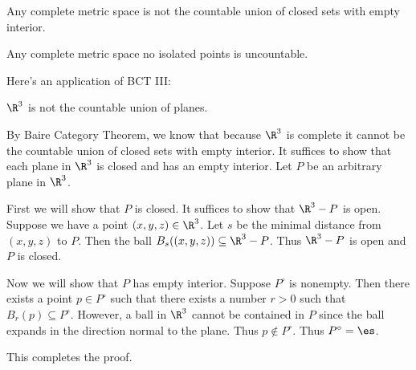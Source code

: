 \documentclass[class=article, crop=false]{standalone}
\begin{document}
\begin{thm}
    Any complete metric space is not the countable union of closed sets with empty interior.
\end{thm}

\begin{coro}
    Any complete metric space no isolated points is uncountable.
\end{coro}

Here's an application of BCT III:
\begin{ex}
    $\R^3$ is not the countable union of planes.
\end{ex}
\begin{pf}
    By Baire Category Theorem, we know that because $\R^3$ is complete it cannot be the countable union of closed sets with empty interior. It suffices to show that each plane in $\R^3$ is closed and has an empty interior. Let $P$ be an arbitrary plane in $\R^3$.

    First we will show that $P$ is closed. It suffices to show that $\R^3-P$ is open. Suppose we have a point $(x,y,z) \in \R^3$. Let $s$ be the minimal distance from $(x,y,z)$ to $P$. Then the ball $B_{s}((x,y,z)) \subseteq \R^3-P$. Thus $\R^3-P$ is open and $P$ is closed.

    Now we will show that $P$ has empty interior. Suppose $P^\circ$ is nonempty. Then there exists a point $p \in P^\circ$ such that there exists a number $r > 0$ such that $B_r(p) \subseteq P^\circ$. However, a ball in $\R^3$ cannot be contained in $P$ since the ball expands in the direction normal to the plane. Thus $p \not \in P^\circ$. Thus $P^\circ = \es$.

    This completes the proof.
\end{pf}
\end{document}
